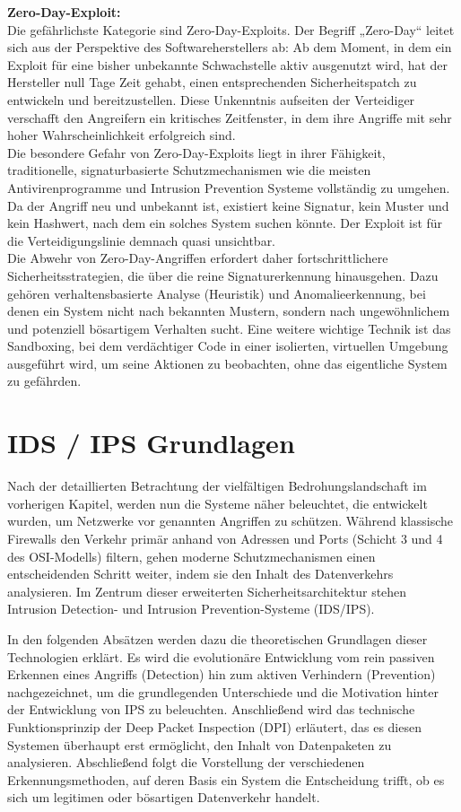 \textbf{Zero-Day-Exploit:}\\
Die gefährlichste Kategorie sind Zero-Day-Exploits. Der Begriff „Zero-Day“ leitet sich aus der Perspektive des Softwareherstellers ab: Ab dem Moment, in dem ein Exploit für eine bisher unbekannte Schwachstelle aktiv ausgenutzt wird, hat der Hersteller null Tage Zeit gehabt, einen entsprechenden Sicherheitspatch zu entwickeln und bereitzustellen. Diese Unkenntnis aufseiten der Verteidiger verschafft den Angreifern ein kritisches Zeitfenster, in dem ihre Angriffe mit sehr hoher Wahrscheinlichkeit erfolgreich sind.\\
Die besondere Gefahr von Zero-Day-Exploits liegt in ihrer Fähigkeit, traditionelle, signaturbasierte Schutzmechanismen wie die meisten Antivirenprogramme und Intrusion Prevention Systeme vollständig zu umgehen. Da der Angriff neu und unbekannt ist, existiert keine Signatur, kein Muster und kein Hashwert, nach dem ein solches System suchen könnte. Der Exploit ist für die Verteidigungslinie demnach quasi unsichtbar.\\
Die Abwehr von Zero-Day-Angriffen erfordert daher fortschrittlichere Sicherheitsstrategien, die über die reine Signaturerkennung hinausgehen. Dazu gehören verhaltensbasierte Analyse (Heuristik) und Anomalieerkennung, bei denen ein System nicht nach bekannten Mustern, sondern nach ungewöhnlichem und potenziell bösartigem Verhalten sucht. Eine weitere wichtige Technik ist das Sandboxing, bei dem verdächtiger Code in einer isolierten, virtuellen Umgebung ausgeführt wird, um seine Aktionen zu beobachten, ohne das eigentliche System zu gefährden.

\section{IDS / IPS Grundlagen}
Nach der detaillierten Betrachtung der vielfältigen Bedrohungslandschaft im vorherigen Kapitel, werden nun die Systeme näher beleuchtet, die entwickelt wurden, um Netzwerke vor genannten Angriffen zu schützen. Während klassische Firewalls den Verkehr primär anhand von Adressen und Ports (Schicht 3 und 4 des OSI-Modells) filtern, gehen moderne Schutzmechanismen einen entscheidenden Schritt weiter, indem sie den Inhalt des Datenverkehrs analysieren. Im Zentrum dieser erweiterten Sicherheitsarchitektur stehen Intrusion Detection- und Intrusion Prevention-Systeme (IDS/IPS).

In den folgenden Absätzen werden dazu die theoretischen Grundlagen dieser Technologien erklärt. Es wird die evolutionäre Entwicklung vom rein passiven Erkennen eines Angriffs (Detection) hin zum aktiven Verhindern (Prevention) nachgezeichnet, um die grundlegenden Unterschiede und die Motivation hinter der Entwicklung von IPS zu beleuchten. Anschließend wird das technische Funktionsprinzip der Deep Packet Inspection (DPI) erläutert, das es diesen Systemen überhaupt erst ermöglicht, den Inhalt von Datenpaketen zu analysieren. Abschließend folgt die Vorstellung der verschiedenen Erkennungsmethoden, auf deren Basis ein System die Entscheidung trifft, ob es sich um legitimen oder bösartigen Datenverkehr handelt.

